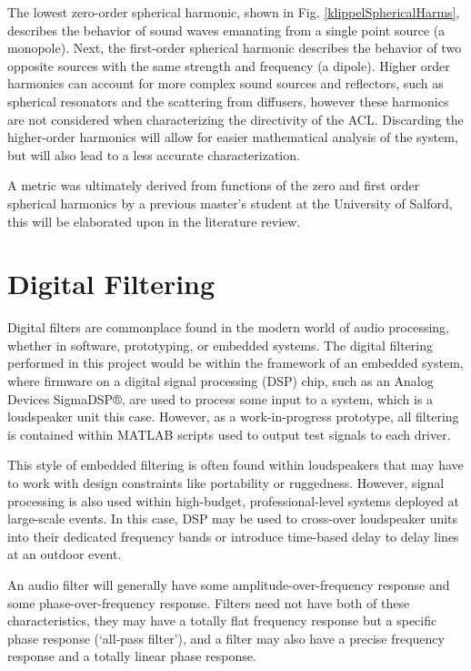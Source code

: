 \documentclass{report}
\begin{document}
        The lowest zero-order spherical harmonic, shown in Fig. \ref{klippelSphericalHarms}, describes the behavior of sound waves emanating from a single point source (a monopole).
        Next, the first-order spherical harmonic describes the behavior of two opposite sources with the same strength and frequency (a dipole).
        Higher order harmonics can account for more complex sound sources and reflectors, such as spherical resonators and the scattering from diffusers, however these harmonics are not considered when characterizing the directivity of the ACL.
        Discarding the higher-order harmonics will allow for easier mathematical analysis of the system, but will also lead to a less accurate characterization.
        
        A metric was ultimately derived from functions of the zero and first order spherical harmonics by a previous master's student at the University of Salford, this will be elaborated upon in the literature review.

    \section{Digital Filtering}
        Digital filters are commonplace found in the modern world of audio processing, whether in software, prototyping, or embedded systems. 
        The digital filtering performed in this project would be within the framework of an embedded system, where firmware on a digital signal processing (DSP) chip, such as an Analog Devices SigmaDSP®, are used to process some input to a system, which is a loudspeaker unit this case.
        However, as a work-in-progress prototype, all filtering is contained within MATLAB scripts used to output test signals to each driver.

        This style of embedded filtering is often found within loudspeakers that may have to work with design constraints like portability or ruggedness.
        However, signal processing is also used within high-budget, professional-level systems deployed at large-scale events.
        In this case, DSP may be used to cross-over loudspeaker units into their dedicated frequency bands or introduce time-based delay to delay lines at an outdoor event.

        An audio filter will generally have some amplitude-over-frequency response and some phase-over-frequency response.
        Filters need not have both of these characteristics, they may have a totally flat frequency response but a specific phase response (`all-pass filter'), and a filter may also have a precise frequency response and a totally linear phase response.
\end{document}
